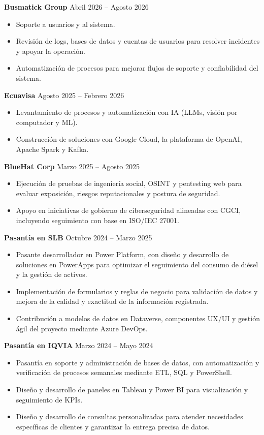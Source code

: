 \documentclass[11pt,a4paper]{article}
\newenvironment{uniformindent}{%
  \begin{list}{}{%
    \setlength{\leftmargin}{2em}
    \setlength{\rightmargin}{0pt}
    \setlength{\topsep}{0pt}
    \setlength{\partopsep}{0pt}
    \setlength{\parsep}{0pt}
    \setlength{\itemsep}{0pt}
  }
  \item[]
}{%
  \end{list}
}
\begin{document}
\begin{uniformindent}
\textbf{Busmatick Group} \hfill Abril 2026 -- Agosto 2026
\begin{itemize}
    \item Soporte a usuarios y al sistema.
    \item Revisi\'on de logs, bases de datos y cuentas de usuarios para resolver incidentes y apoyar la operaci\'on.
    \item Automatizaci\'on de procesos para mejorar flujos de soporte y confiabilidad del sistema.
\end{itemize}

\textbf{Ecuavisa} \hfill Agosto 2025 -- Febrero 2026
\begin{itemize}
    \item Levantamiento de procesos y automatizaci\'on con IA (LLMs, visi\'on por computador y ML).
    \item Construcci\'on de soluciones con Google Cloud, la plataforma de OpenAI, Apache Spark y Kafka.
\end{itemize}

\textbf{BlueHat Corp} \hfill Marzo 2025 -- Agosto 2025
\begin{itemize}
    \item Ejecuci\'on de pruebas de ingenier\'ia social, OSINT y pentesting web para evaluar exposici\'on, riesgos reputacionales y postura de seguridad.
    \item Apoyo en iniciativas de gobierno de ciberseguridad alineadas con CGCI, incluyendo seguimiento con base en ISO/IEC 27001.
\end{itemize}

\begin{samepage}
\textbf{Pasant\'ia en SLB} \hfill Octubre 2024 -- Marzo 2025
\begin{itemize}
    \item Pasante desarrollador en Power Platform, con dise\~no y desarrollo de soluciones en PowerApps para optimizar el seguimiento del consumo de di\'esel y la gesti\'on de activos.
    \item Implementaci\'on de formularios y reglas de negocio para validaci\'on de datos y mejora de la calidad y exactitud de la informaci\'on registrada.
    \item Contribuci\'on a modelos de datos en Dataverse, componentes UX/UI y gesti\'on \'agil del proyecto mediante Azure DevOps.
\end{itemize}
\end{samepage}

\textbf{Pasant\'ia en IQVIA} \hfill Marzo 2024 -- Mayo 2024
\begin{itemize}
    \item Pasant\'ia en soporte y administraci\'on de bases de datos, con automatizaci\'on y verificaci\'on de procesos semanales mediante ETL, SQL y PowerShell.
    \item Dise\~no y desarrollo de paneles en Tableau y Power BI para visualizaci\'on y seguimiento de KPIs.
    \item Dise\~no y desarrollo de consultas personalizadas para atender necesidades espec\'ificas de clientes y garantizar la entrega precisa de datos.
\end{itemize}


\end{uniformindent}
\end{document}
